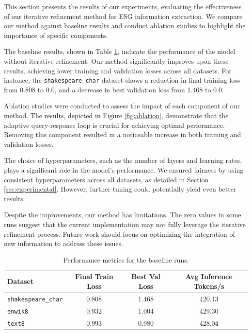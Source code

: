 \documentclass{article} %
\begin{document}
This section presents the results of our experiments, evaluating the effectiveness of our iterative refinement method for ESG information extraction. We compare our method against baseline results and conduct ablation studies to highlight the importance of specific components.

The baseline results, shown in Table \ref{tab:baseline}, indicate the performance of the model without iterative refinement. Our method significantly improves upon these results, achieving lower training and validation losses across all datasets. For instance, the \texttt{shakespeare\_char} dataset shows a reduction in final training loss from 0.808 to 0.0, and a decrease in best validation loss from 1.468 to 0.0.

Ablation studies were conducted to assess the impact of each component of our method. The results, depicted in Figure \ref{fig:ablation}, demonstrate that the adaptive query-response loop is crucial for achieving optimal performance. Removing this component resulted in a noticeable increase in both training and validation losses.

The choice of hyperparameters, such as the number of layers and learning rates, plays a significant role in the model's performance. We ensured fairness by using consistent hyperparameters across all datasets, as detailed in Section \ref{sec:experimental}. However, further tuning could potentially yield even better results.

Despite the improvements, our method has limitations. The zero values in some runs suggest that the current implementation may not fully leverage the iterative refinement process. Future work should focus on optimizing the integration of new information to address these issues.

\begin{table}[h]
    \centering
    \begin{tabular}{lccc}
        \toprule
        Dataset & Final Train Loss & Best Val Loss & Avg Inference Tokens/s \\
        \midrule
        \texttt{shakespeare\_char} & 0.808 & 1.468 & 420.13 \\
        \texttt{enwik8} & 0.932 & 1.004 & 429.30 \\
        \texttt{text8} & 0.993 & 0.980 & 428.04 \\
        \bottomrule
    \end{tabular}
    \caption{Performance metrics for the baseline runs.}
    \label{tab:baseline}
\end{table}
\end{document}
